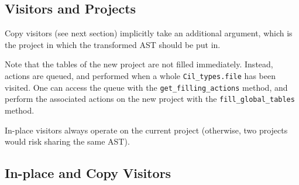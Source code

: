 \subsection{Visitors and Projects}\label{sec:visitors-projects}

Copy visitors (see next section) implicitly take an
additional argument, which is the project in which the transformed
AST should be put in.

Note that the tables of the new project are not filled immediately. Instead,
actions are queued, and performed when a whole
\verb+Cil_types.file+ has been visited. One can
access the queue with the
\verb+get_filling_actions+
method, and perform the associated actions on the new project with the
\verb+fill_global_tables+
method.

In-place visitors  always operate on the
current project (otherwise, two projects would
risk sharing the same AST).

\subsection{In-place and Copy Visitors}\label{adv:sec:place-copy-visitors}


